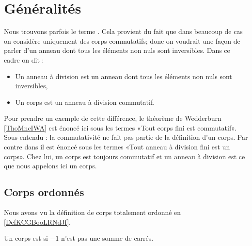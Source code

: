
\section{Généralités}

\begin{normaltext}      \label{NORMooGPWRooIKJqqw}
    Nous trouvons parfois le terme . Cela provient du fait que dans beaucoup de cas on considère uniquement des corps commutatifs; donc on voudrait une façon de parler d'un anneau dont tous les éléments non nuls sont inversibles. Dans ce cadre on dit :
    \begin{itemize}
        \item Un anneau à division est un anneau dont tous les éléments non nuls sont inversibles,
        \item Un corps est un anneau à division commutatif.
    \end{itemize}
    Pour prendre un exemple de cette différence, le théorème de Wedderburn \ref{ThoMncIWA} est énoncé ici sous les termes «Tout corps fini est commutatif». Sous-entendu : la commutativité ne fait pas partie de la définition d'un corps. Par contre dans \cite{KXjFWKA} il est énoncé sous les termes «Tout anneau à division fini est un corps». Chez lui, un corps est toujours commutatif et un anneau à division est ce que nous appelons ici un corps.
\end{normaltext}


\subsection{Corps ordonnés}

Nous avons vu la définition de corps totalement ordonné en \ref{DefKCGBooLRNdJf}.

\begin{definition}
    Un corps est  si \( -1\) n'est pas une somme de carrés.
\end{definition}

